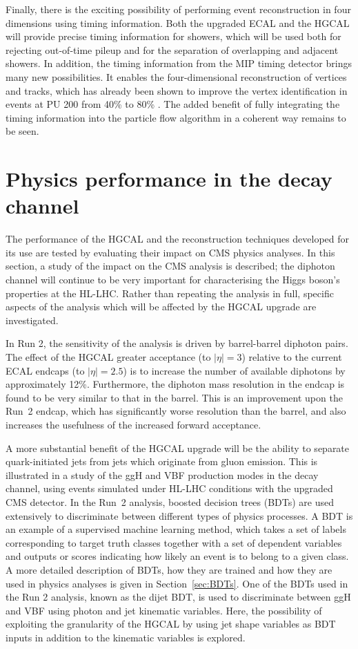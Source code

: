 Finally, there is the exciting possibility of performing event reconstruction in four dimensions using timing information.
Both the upgraded ECAL and the HGCAL will provide precise timing information for showers, 
which will be used both for rejecting out-of-time pileup and for the separation of overlapping and adjacent showers.
In addition, the timing information from the MIP timing detector brings many new possibilities. 
It enables the four-dimensional reconstruction of vertices and tracks, 
which has already been shown to improve the vertex identification in \Hgg events at PU 200 from 40\% to 80\% \cite{MTD}.
The added benefit of fully integrating the timing information into the particle flow algorithm in a coherent way remains to be seen.

\section{Physics performance in the \Hgg decay channel}
\label{sec:hgcal_physics}
The performance of the HGCAL and the reconstruction techniques developed for its use 
are tested by evaluating their impact on CMS physics analyses.
In this section, a study of the impact on the CMS \Hgg analysis is described;
the diphoton channel will continue to be very important for characterising the Higgs boson's 
properties at the HL-LHC.
Rather than repeating the analysis in full, 
specific aspects of the analysis which will be affected by the HGCAL upgrade are investigated.

In Run 2, the sensitivity of the \Hgg analysis is driven by barrel-barrel diphoton pairs.
The effect of the HGCAL greater acceptance (to $|\eta|=3$) relative to the current ECAL endcaps
(to $|\eta|=2.5$) is to increase the number of available diphotons by approximately 12\%.
Furthermore, the diphoton mass resolution in the endcap is found to be very similar 
to that in the barrel.
This is an improvement upon the Run~2 endcap, 
which has significantly worse resolution than the barrel, 
and also increases the usefulness of the increased forward acceptance.

A more substantial benefit of the HGCAL upgrade 
will be the ability to separate quark-initiated jets from jets which originate from gluon emission.
This is illustrated in a study of the ggH and VBF production modes in the \Hgg decay channel, 
using events simulated under HL-LHC conditions with the upgraded CMS detector.
In the Run~2 analysis, boosted decision trees (BDTs) 
are used extensively to discriminate between different types of physics processes.
A BDT is an example of a supervised machine learning method, 
which takes a set of labels corresponding to target truth classes 
together with a set of dependent variables and outputs or scores indicating how likely 
an event is to belong to a given class.
A more detailed description of BDTs, how they are trained 
and how they are used in physics analyses is given in Section~\ref{sec:BDTs}.
One of the BDTs used in the Run 2 analysis, known as the dijet BDT,
is used to discriminate between ggH and VBF using photon and jet kinematic variables.
Here, the possibility of exploiting the granularity of the HGCAL 
by using jet shape variables as BDT inputs in addition to the kinematic variables is explored.

